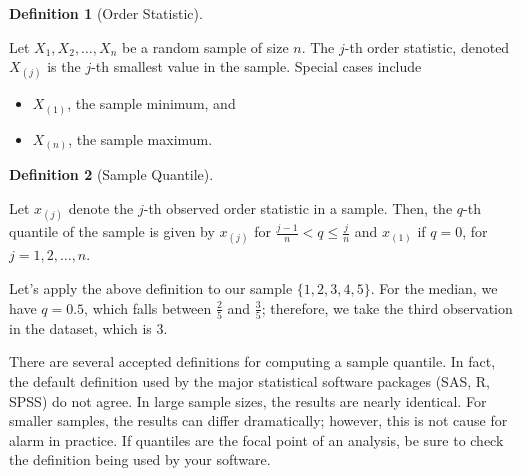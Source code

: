 \documentclass[
  letterpaper,
  DIV=11,
  numbers=noendperiod]{scrreprt}
\providecommand{\tightlist}{%
  \setlength{\itemsep}{0pt}\setlength{\parskip}{0pt}}\usepackage{longtable,booktabs,array}
\theoremstyle{definition}
\newtheorem{definition}{Definition}[chapter]
\theoremstyle{definition}
\theoremstyle{plain}
\theoremstyle{remark}
\begin{document}
\begin{definition}[Order
Statistic]\protect\hypertarget{def-order-statistic}{}\label{def-order-statistic}

Let \(X_1, X_2, \dotsc, X_n\) be a random sample of size \(n\). The
\(j\)-th order statistic, denoted \(X_{(j)}\) is the \(j\)-th smallest
value in the sample. Special cases include

\begin{itemize}
\tightlist
\item
  \(X_{(1)}\), the sample minimum, and
\item
  \(X_{(n)}\), the sample maximum.
\end{itemize}

\end{definition}

\begin{definition}[Sample
Quantile]\protect\hypertarget{def-sample-quantile}{}\label{def-sample-quantile}

Let \(x_{(j)}\) denote the \(j\)-th observed order statistic in a
sample. Then, the \(q\)-th quantile of the sample is given by
\(x_{(j)}\) for \(\frac{j-1}{n} < q \leq \frac{j}{n}\) and \(x_{(1)}\)
if \(q = 0\), for \(j=1,2,\dotsc,n\).

\end{definition}

Let's apply the above definition to our sample \(\{1, 2, 3, 4, 5\}\).
For the median, we have \(q = 0.5\), which falls between \(\frac{2}{5}\)
and \(\frac{3}{5}\); therefore, we take the third observation in the
dataset, which is 3.

\begin{tcolorbox}[enhanced jigsaw, title=\textcolor{quarto-callout-note-color}{\faInfo}\hspace{0.5em}{Note}, colbacktitle=quarto-callout-note-color!10!white, titlerule=0mm, toptitle=1mm, breakable, bottomtitle=1mm, colframe=quarto-callout-note-color-frame, opacitybacktitle=0.6, bottomrule=.15mm, arc=.35mm, toprule=.15mm, colback=white, rightrule=.15mm, coltitle=black, leftrule=.75mm, left=2mm, opacityback=0]

There are several accepted definitions for computing a sample quantile.
In fact, the default definition used by the major statistical software
packages (SAS, R, SPSS) do not agree. In large sample sizes, the results
are nearly identical. For smaller samples, the results can differ
dramatically; however, this is not cause for alarm in practice. If
quantiles are the focal point of an analysis, be sure to check the
definition being used by your software.

\end{tcolorbox}
\end{document}
